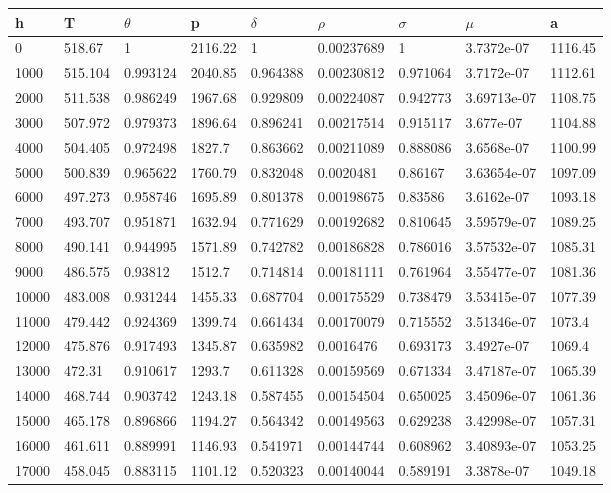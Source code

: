\begin{tabular}{lllllllll}
h & T & $\theta$ & p & $\delta$ & $\rho$ & $\sigma$ & $\mu$ & a \\
\hline
0 & 518.67 & 1 & 2116.22 & 1 & 0.00237689 & 1 & 3.7372e-07 & 1116.45 \\
1000 & 515.104 & 0.993124 & 2040.85 & 0.964388 & 0.00230812 & 0.971064 & 3.7172e-07 & 1112.61 \\
2000 & 511.538 & 0.986249 & 1967.68 & 0.929809 & 0.00224087 & 0.942773 & 3.69713e-07 & 1108.75 \\
3000 & 507.972 & 0.979373 & 1896.64 & 0.896241 & 0.00217514 & 0.915117 & 3.677e-07 & 1104.88 \\
4000 & 504.405 & 0.972498 & 1827.7 & 0.863662 & 0.00211089 & 0.888086 & 3.6568e-07 & 1100.99 \\
5000 & 500.839 & 0.965622 & 1760.79 & 0.832048 & 0.0020481 & 0.86167 & 3.63654e-07 & 1097.09 \\
6000 & 497.273 & 0.958746 & 1695.89 & 0.801378 & 0.00198675 & 0.83586 & 3.6162e-07 & 1093.18 \\
7000 & 493.707 & 0.951871 & 1632.94 & 0.771629 & 0.00192682 & 0.810645 & 3.59579e-07 & 1089.25 \\
8000 & 490.141 & 0.944995 & 1571.89 & 0.742782 & 0.00186828 & 0.786016 & 3.57532e-07 & 1085.31 \\
9000 & 486.575 & 0.93812 & 1512.7 & 0.714814 & 0.00181111 & 0.761964 & 3.55477e-07 & 1081.36 \\
10000 & 483.008 & 0.931244 & 1455.33 & 0.687704 & 0.00175529 & 0.738479 & 3.53415e-07 & 1077.39 \\
11000 & 479.442 & 0.924369 & 1399.74 & 0.661434 & 0.00170079 & 0.715552 & 3.51346e-07 & 1073.4 \\
12000 & 475.876 & 0.917493 & 1345.87 & 0.635982 & 0.0016476 & 0.693173 & 3.4927e-07 & 1069.4 \\
13000 & 472.31 & 0.910617 & 1293.7 & 0.611328 & 0.00159569 & 0.671334 & 3.47187e-07 & 1065.39 \\
14000 & 468.744 & 0.903742 & 1243.18 & 0.587455 & 0.00154504 & 0.650025 & 3.45096e-07 & 1061.36 \\
15000 & 465.178 & 0.896866 & 1194.27 & 0.564342 & 0.00149563 & 0.629238 & 3.42998e-07 & 1057.31 \\
16000 & 461.611 & 0.889991 & 1146.93 & 0.541971 & 0.00144744 & 0.608962 & 3.40893e-07 & 1053.25 \\
17000 & 458.045 & 0.883115 & 1101.12 & 0.520323 & 0.00140044 & 0.589191 & 3.3878e-07 & 1049.18 \\

\end{tabular}
